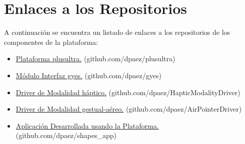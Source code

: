 \section{Enlaces a los Repositorios} \label{sec:end_links}
A continuación se encuentra un listado de enlaces a los repositorios de los componentes de la plataforma:
\begin{itemize}

\item \href{https://github.com/dpaez/plusultra}{Plataforma plusultra.}  (github.com/dpaez/plusultra)

\item \href{https://github.com/dpaez/gyes}{Módulo Interfaz gyes.} (github.com/dpaez/gyes)

\item \href{https://github.com/dpaez/HapticModalityDriver}{Driver de Modalidad háptico.} (github.com/dpaez/HapticModalityDriver)

\item \href{https://github.com/dpaez/AirPointerDriver}{Driver de Modalidad gestual-aéreo.} (github.com/dpaez/AirPointerDriver)

\item \href{https://github.com/dpaez/shapes\_app}{Aplicación Desarrollada usando la Plataforma.} (github.com/dpaez/shapes\_app)

\end{itemize}